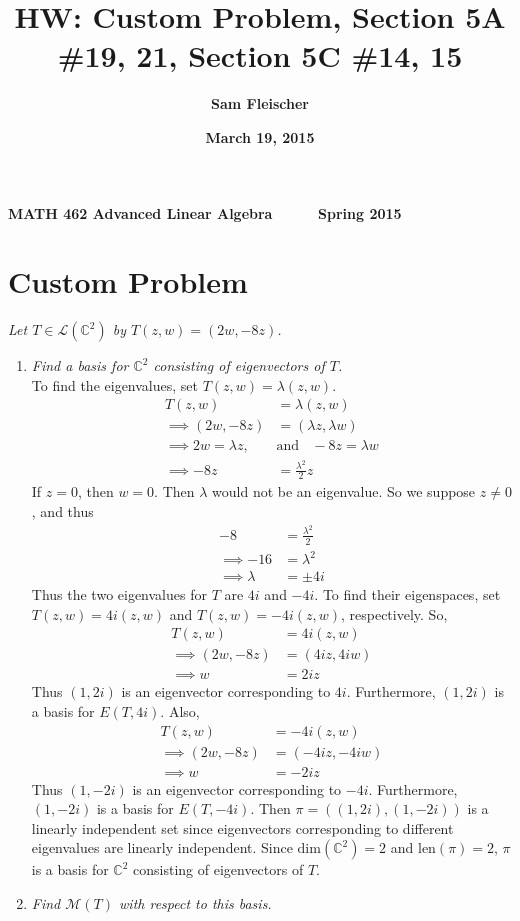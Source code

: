\documentclass[12pt]{article}
\title{\bf HW: Custom Problem, Section 5A \#19, 21, Section 5C \#14, 15}
\author{\bf Sam Fleischer}
\date{\bf March 19, 2015}
\begin{document}
{\bf MATH 462 \hfill Advanced Linear Algebra \ \ \ \ \ \hfill Spring 2015} 

{\let\newpage\relax\maketitle}

\section*{Custom Problem}
{\it Let $T \in \mathcal{L}(\mathbb{C}^2)$ by $T(z, w) = (2w, -8z)$.}
	\begin{enumerate}[\it\ \ (a)\ \ ]
		\item {\it Find a basis for $\mathbb{C}^2$ consisting of eigenvectors of $T$.}\\
		
		\noindent To find the eigenvalues, set $T(z, w) = \lambda(z, w)$.
		\begin{align*}
			T(z, w) &= \lambda(z, w) \\
			\implies (2w, -8z) &= (\lambda z, \lambda w) \\
			\implies 2w = \lambda z\text{,} \ \ \ \ &\text{and}\ \ \ \ -8z = \lambda w \\
			\implies -8z &= \frac{\lambda^2}{2}z
		\end{align*}
		If $z = 0$, then $w = 0$.  Then $\lambda$ would not be an eigenvalue.  So we suppose $z \neq 0$, and thus
		\begin{align*}
			-8 &= \frac{\lambda^2}{2} \\
			\implies -16 &= \lambda^2 \\
			\implies \lambda &= \pm 4i
		\end{align*}
		Thus the two eigenvalues for $T$ are $4i$ and $-4i$.  To find their eigenspaces, set $T(z, w) = 4i(z, w)$ and $T(z, w) = -4i(z, w)$, respectively.  So,
		\begin{align*}
			T(z, w) &= 4i(z, w) \\
			\implies (2w, -8z) &= (4iz, 4iw) \\
			\implies w &= 2iz
		\end{align*}
		Thus $(1, 2i)$ is an eigenvector corresponding to $4i$.  Furthermore, $(1, 2i)$ is a basis for $E(T, 4i)$.  Also,
		\begin{align*}
			T(z, w) &= -4i(z, w) \\
			\implies (2w, -8z) &= (-4iz, -4iw) \\
			\implies w &= -2iz
		\end{align*}
		Thus $(1, -2i)$ is an eigenvector corresponding to $-4i$.  Furthermore, $(1, -2i)$ is a basis for $E(T, -4i)$.  Then $\pi = ((1, 2i), (1, -2i))$ is a linearly independent set since eigenvectors corresponding to different eigenvalues are linearly independent.  Since $\text{dim}(\mathbb{C}^2) = 2$ and $\text{len}(\pi) = 2$, $\pi$ is a basis for $\mathbb{C}^2$ consisting of eigenvectors of $T$.
		\item {\it Find $\mathcal{M}(T)$ with respect to this basis.}\\
		

\end{enumerate}
\end{document}
